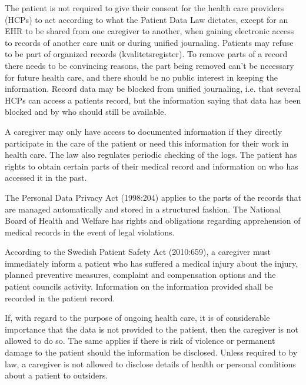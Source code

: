 \documentclass[14pt]{article}
\begin{document}
The patient is not required to give their consent for the health care providers (\glspl{HCP}) to act according to what the Patient Data Law dictates, except for an \gls{EHR} to be shared from one caregiver to another, when gaining electronic access to records of another care unit or during unified journaling. Patients may refuse to be part of organized records (kvalitetsregister). To remove parts of a record there needs to be convincing reasons, the part being removed can't be necessary for future health care, and there should be no public interest in keeping the information. Record data may be blocked from unified journaling, i.e. that several \glspl{HCP} can access a patients record, but the information saying that data has been blocked and by who should still be available. 

A caregiver may only have access to documented information if they directly participate in the care of the patient or need this information for their work in health care. The law also regulates periodic checking of the logs. The patient has rights to obtain certain parts of their medical record and information on who has accessed it in the past.\cite{PatientDataAct}

The Personal Data Privacy Act (1998:204) applies to the parts of the records that are managed automatically and stored in a structured fashion. The National Board of Health and Welfare has rights and obligations regarding apprehension of medical records in the event of legal violations.\cite{PatientDataAct}

According to the Swedish Patient Safety Act (2010:659), a caregiver must immediately inform a patient who has suffered a medical injury about the injury, planned preventive measures, complaint and compensation
options and the patient councils activity. Information on the information provided shall be recorded in the patient record.\cite{PatientSafetyAct}

If, with regard to the purpose of ongoing health care, it is of considerable importance that the data is not provided to the patient, then the caregiver is not allowed to do so. The same applies if there is risk of violence or permanent damage to the patient should the information be disclosed. Unless required to by law, a caregiver is not allowed to disclose details of health or personal conditions about a patient to outsiders.\cite{PatientSafetyAct}
\end{document}
